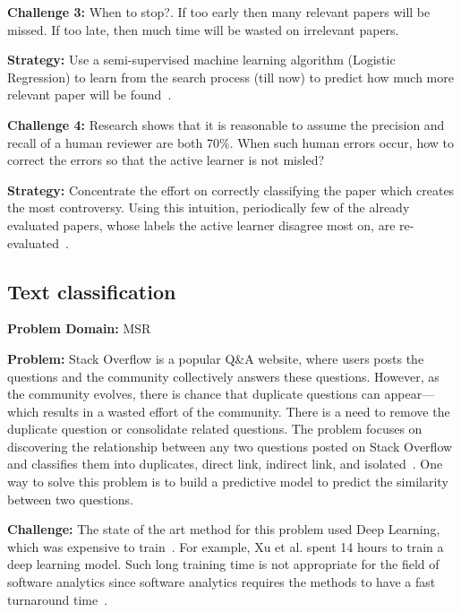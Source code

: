 \documentclass[sigconf,anonymous,review]{acmart}
\begin{document}
\vspace{1.0ex}
\noindent\textbf{Challenge 3: }
When to stop?. If too early then   many   relevant papers will be missed.
If too late, then much time will be wasted on irrelevant papers. 

\noindent\textbf{Strategy: }
Use a semi-supervised machine learning algorithm (Logistic Regression) to learn from the search process (till now) to predict how much more relevant paper will be found~\cite{YuM17}. 

\vspace{1.0ex}
\noindent\textbf{Challenge 4: }
Research shows that it is reasonable to assume the precision and recall of a human reviewer are both 70\%. When such human errors occur, how to correct the errors so that the active learner is not misled?

\noindent\textbf{Strategy: }
Concentrate the effort on correctly classifying the paper which creates the most controversy. Using this intuition, periodically few of the already evaluated papers, whose labels the active learner disagree most on, are re-evaluated~\cite{YuM17}.



    \subsection{Text classification}
\noindent\textbf{Problem Domain: } MSR

\noindent\textbf{Problem: } Stack Overflow is a popular Q\&A website, where users posts the questions and the community collectively answers these questions. However, as the community evolves, there is chance that duplicate questions can appear---which results in a wasted effort of the community. There is a need to remove the duplicate question or consolidate related questions. The problem focuses on discovering the relationship between any two questions posted on Stack Overflow and classifies them into duplicates, direct link, indirect link, and isolated~\cite{fu2017easy, xu2016predicting}. One way to solve this problem is to build a predictive model to predict the similarity between two questions. 

\noindent\textbf{Challenge: } The state of the art method for this problem used Deep Learning, which was expensive to train~\cite{xu2016predicting}. For example, Xu et al. spent 14 hours to train a deep learning model. Such long training time is not appropriate for the field of software analytics since software analytics requires the methods to have a fast turnaround time~\cite{zhang2013software}.
\end{document}
